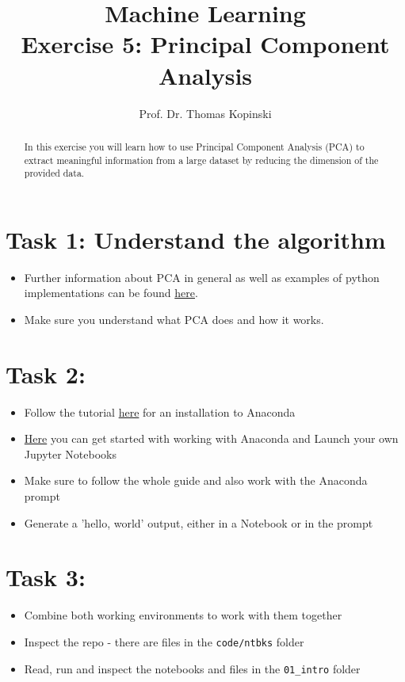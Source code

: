 \documentclass{article}
\title{Machine Learning \\ Exercise 5: Principal Component Analysis}
\author{Prof. Dr. Thomas Kopinski}
\begin{document}
\maketitle

\begin{abstract}
In this exercise you will learn how to use Principal Component Analysis (PCA) to extract meaningful information from a large dataset by reducing the dimension of the provided data.
\end{abstract}

\section*{Task 1: Understand the algorithm}

\begin{itemize}
    \item Further information about PCA in general as well as examples of python implementations can be found \href{https://github.com/DataScienceLabFHSWF/machine-learning-book/blob/main/notebooks/ch05/ch05.ipynb}{here}.
    \item Make sure you understand what PCA does and how it works.
\end{itemize}

\section*{Task 2: }

\begin{itemize}
    \item Follow the tutorial \href{https://docs.anaconda.com/anaconda/install/index.html}{here} for an installation to Anaconda
    \item \href{https://docs.anaconda.com/anaconda/user-guide/getting-started/}{Here} you can get started with working with Anaconda and Launch your own Jupyter Notebooks
    \item Make sure to follow the whole guide and also work with the Anaconda prompt
    \item Generate a 'hello, world' output, either in a Notebook or in the prompt
\end{itemize}

\section*{Task 3: }

\begin{itemize}
    \item Combine both working environments to work with them together
    \item Inspect the repo - there are files in the \verb+code/ntbks+  folder
    \item Read, run and inspect the notebooks and files in the \verb+01_intro+ folder

\end{itemize}

%
%
\end{document}
